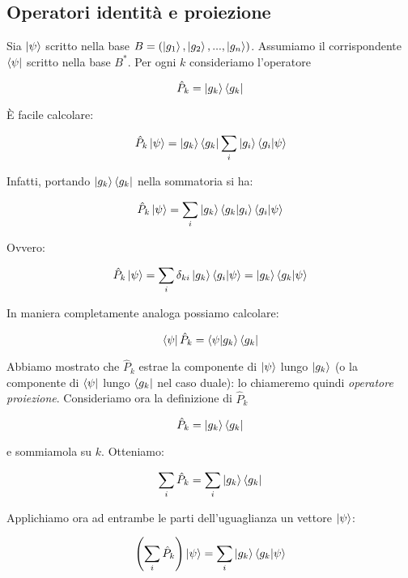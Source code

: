 \subsection{Operatori identità e proiezione}

Sia $\ket{\psi}$ scritto nella base $B = (\ket{g_1}, \ket{g_2}, ..., \ket{g_n})$. Assumiamo il corrispondente $\bra{\psi}$ scritto nella base $B^*$. Per ogni $k$ consideriamo l'operatore

	\[
		\hat{P}_k = \ket{g_k} \bra{g_k}
	\]

È facile calcolare:

	\begin{equation}
		\hat{P}_k \ket{\psi} = \ket{g_k} \bra{g_k} \sum_i \ket{g_i} \braket{g_i}{\psi}
	\end{equation}

Infatti, portando $\ket{g_k} \bra{g_k}$ nella sommatoria si ha:

	\begin{equation}
		\hat{P}_k \ket{\psi} = \sum_i \ket{g_k} \braket{g_k}{g_i} \braket{g_i}{\psi}
	\end{equation}

Ovvero:

	\begin{equation}
		\hat{P}_k \ket{\psi} = \sum_i \delta_{ki} \ket{g_k} \braket{g_i}{\psi} =  \ket{g_k} \braket{g_k}{\psi}
	\end{equation}

In maniera completamente analoga possiamo calcolare:

	\begin{equation}
		\bra{\psi} \hat{P}_k = \braket{\psi}{g_k} \bra{g_k}
	\end{equation}

Abbiamo mostrato che $\hat{P}_k$ estrae la componente di $\ket{\psi}$ lungo $\ket{g_k}$ (o la componente di $\bra{\psi}$ lungo $\bra{g_k}$ nel caso duale): lo chiameremo quindi \textit{operatore proiezione}.
Consideriamo ora la definizione di $\hat{P}_k$

	\[
		\hat{P}_k = \ket{g_k} \bra{g_k}
	\]

e sommiamola su $k$. Otteniamo:

	\begin{equation}
		\sum_i \hat{P}_k = \sum_i \ket{g_k} \bra{g_k}
	\end{equation}

Applichiamo ora ad entrambe le parti dell'uguaglianza un vettore $\ket{\psi}$:

	\begin{equation} \label{eq:identityDeriv1}
		\left ( \sum_i \hat{P}_k \right ) \ket{\psi} = \sum_i \ket{g_k} \braket{g_k}{\psi}
	\end{equation}

